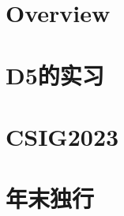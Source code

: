 \documentclass{si_template/cn_book}
\begin{document}
\frontmatter
\mainmatter

\chapter{Overview}


\chapter{D5的实习}
\chapter{CSIG2023}
\chapter{年末独行}

\backmatter
\end{document}
